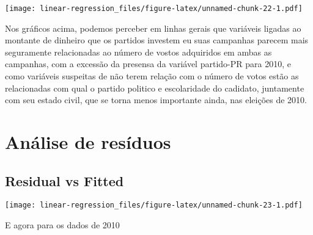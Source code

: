 \documentclass[]{article}
\newenvironment{Shaded}{\begin{snugshade}}{\end{snugshade}}
\newcommand{\KeywordTok}[1]{\textcolor[rgb]{0.13,0.29,0.53}{\textbf{#1}}}
\newcommand{\DataTypeTok}[1]{\textcolor[rgb]{0.13,0.29,0.53}{#1}}
\newcommand{\DecValTok}[1]{\textcolor[rgb]{0.00,0.00,0.81}{#1}}
\newcommand{\StringTok}[1]{\textcolor[rgb]{0.31,0.60,0.02}{#1}}
\newcommand{\OperatorTok}[1]{\textcolor[rgb]{0.81,0.36,0.00}{\textbf{#1}}}
\newcommand{\NormalTok}[1]{#1}
\begin{document}
\texttt{[image: linear-regression\_files/figure-latex/unnamed-chunk-22-1.pdf]}

Nos gráficos acima, podemos perceber em linhas gerais que variáveis
ligadas ao montante de dinheiro que os partidos investem eu suas
campanhas parecem mais seguramente relacionadas ao número de vostos
adquiridos em ambas as campanhas, com a excessão da presensa da variável
partido-PR para 2010, e como variáveis suspeitas de não terem relação
com o número de votos estão as relacionadas com qual o partido politico
e escolaridade do cadidato, juntamente com seu estado civil, que se
torna menos importante ainda, nas eleições de 2010.

\section{Análise de resíduos}\label{analise-de-residuos}

\subsection{Residual vs Fitted}\label{residual-vs-fitted}

\begin{Shaded}
\end{Shaded}

\texttt{[image: linear-regression\_files/figure-latex/unnamed-chunk-23-1.pdf]}

E agora para os dados de 2010
\end{document}
